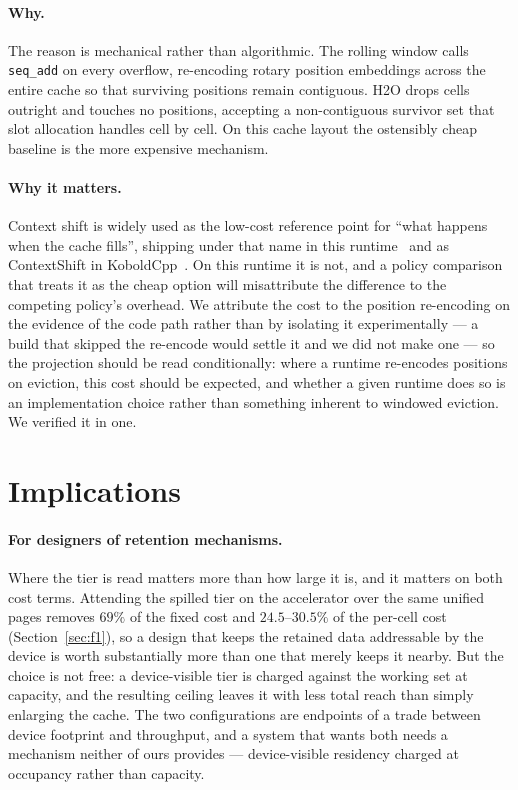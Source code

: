 \documentclass[manuscript,anonymous,review]{acmart}
\begin{document}
\paragraph{Why.} The reason is mechanical rather than algorithmic. The
rolling window calls \texttt{seq\_add} on every overflow, re-encoding
rotary position embeddings across the entire cache so that surviving
positions remain contiguous. H2O drops cells outright and touches no
positions, accepting a non-contiguous survivor set that slot allocation
handles cell by cell. On this cache layout the ostensibly cheap
baseline is the more expensive mechanism.

\paragraph{Why it matters.} Context shift is widely used as the
low-cost reference point for ``what happens when the cache fills'',
shipping under that name in this
runtime~\cite{llamacpp_contextshift} and as ContextShift in
KoboldCpp~\cite{koboldcpp_contextshift}. On
this runtime it is not, and a policy comparison that treats it as the
cheap option will misattribute the difference to the competing
policy's overhead. We attribute the cost to the position re-encoding
on the evidence of the code path rather than by isolating it
experimentally --- a build that skipped the re-encode would settle it
and we did not make one --- so the projection should be read
conditionally: where a runtime re-encodes positions on eviction, this
cost should be expected, and whether a given runtime does so is an
implementation choice rather than something inherent to windowed
eviction. We verified it in one.

\section{Implications}
\label{sec:implications}

\paragraph{For designers of retention mechanisms.} Where the tier is
read matters more than how large it is, and it matters on both cost
terms. Attending the spilled tier on the accelerator over the same
unified pages removes $69\%$ of the fixed cost and $24.5$--$30.5\%$ of the
per-cell cost (Section~\ref{sec:f1}), so a design that keeps the
retained data addressable by the device is worth substantially more
than one that merely keeps it nearby. But the choice is not free: a
device-visible tier is charged against the working set at capacity, and
the resulting ceiling leaves it with less total reach than simply
enlarging the cache. The two configurations are endpoints of a trade
between device footprint and throughput, and a system that wants both
needs a mechanism neither of ours provides --- device-visible residency
charged at occupancy rather than capacity.
\end{document}
